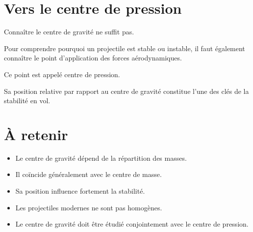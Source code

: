 \section{Vers le centre de pression}

Connaître le centre de gravité ne suffit pas.

Pour comprendre pourquoi un projectile est stable ou instable, il faut
également connaître le point d'application des forces aérodynamiques.

Ce point est appelé centre de pression.

Sa position relative par rapport au centre de gravité constitue l'une des
clés de la stabilité en vol.

\section{À retenir}

\begin{aretenir}

\begin{itemize}
    \item Le centre de gravité dépend de la répartition des masses.
    \item Il coïncide généralement avec le centre de masse.
    \item Sa position influence fortement la stabilité.
    \item Les projectiles modernes ne sont pas homogènes.
    \item Le centre de gravité doit être étudié conjointement avec le centre
    de pression.
\end{itemize}

\end{aretenir}
